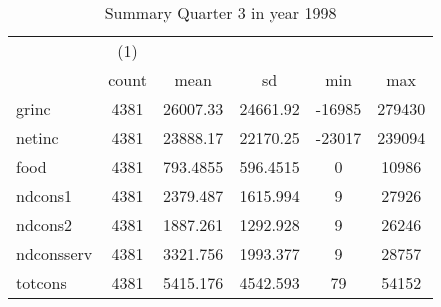 \begin{table}[htbp]\centering
\def\sym#1{\ifmmode^{#1}\else\(^{#1}\)\fi}
\caption{Summary Quarter 3 in year 1998 \label{sum\_Q3\_y1998}}
\begin{tabular}{l*{1}{ccccc}}
\hline\hline
            &\multicolumn{1}{c}{(1)}&            &            &            &            \\
            &       count&        mean&          sd&         min&         max\\
\hline
grinc       &        4381&    26007.33&    24661.92&      -16985&      279430\\
netinc      &        4381&    23888.17&    22170.25&      -23017&      239094\\
food        &        4381&    793.4855&    596.4515&           0&       10986\\
ndcons1     &        4381&    2379.487&    1615.994&           9&       27926\\
ndcons2     &        4381&    1887.261&    1292.928&           9&       26246\\
ndconsserv  &        4381&    3321.756&    1993.377&           9&       28757\\
totcons     &        4381&    5415.176&    4542.593&          79&       54152\\
\hline\hline
\end{tabular}
\end{table}
